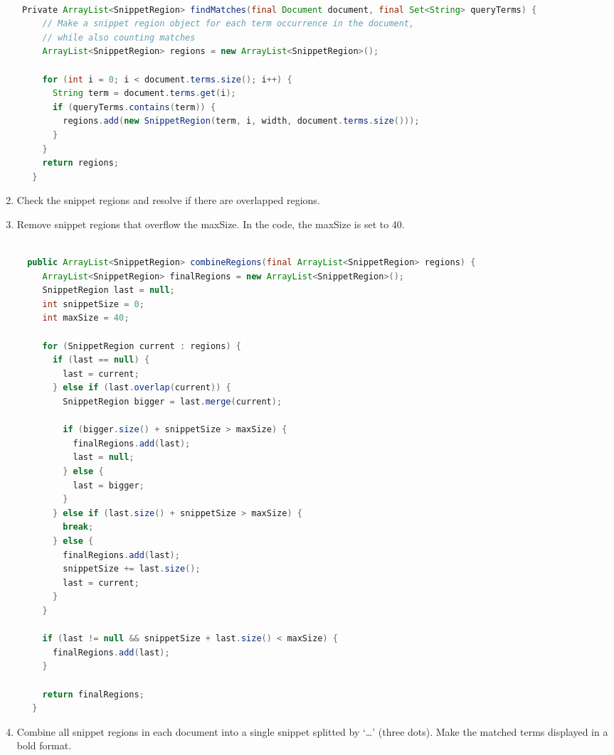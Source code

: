 \documentclass[letterpaper,11pt]{article}
\begin{document}
\begin{enumerate}
\begin{lstlisting}[language=Java, caption={}, label={lst:step3}]

 Private ArrayList<SnippetRegion> findMatches(final Document document, final Set<String> queryTerms) {
     // Make a snippet region object for each term occurrence in the document,
     // while also counting matches
     ArrayList<SnippetRegion> regions = new ArrayList<SnippetRegion>();
 
     for (int i = 0; i < document.terms.size(); i++) {
       String term = document.terms.get(i);
       if (queryTerms.contains(term)) {
         regions.add(new SnippetRegion(term, i, width, document.terms.size()));
       }
     }
     return regions;
   }

\end{lstlisting}

\item Check the snippet regions and resolve if there are overlapped regions.
\item Remove snippet regions that overflow the maxSize. In the code, the maxSize is set to 40. 

\begin{lstlisting}[language=Java, caption={}, label={lst:step4}]

  public ArrayList<SnippetRegion> combineRegions(final ArrayList<SnippetRegion> regions) {
     ArrayList<SnippetRegion> finalRegions = new ArrayList<SnippetRegion>();
     SnippetRegion last = null;
     int snippetSize = 0;
     int maxSize = 40;
 
     for (SnippetRegion current : regions) {
       if (last == null) {
         last = current;
       } else if (last.overlap(current)) {
         SnippetRegion bigger = last.merge(current);
 
         if (bigger.size() + snippetSize > maxSize) {
           finalRegions.add(last);
           last = null;
         } else {
           last = bigger;
         }
       } else if (last.size() + snippetSize > maxSize) {
         break;
       } else {
         finalRegions.add(last);
         snippetSize += last.size();
         last = current;
       }
     }
 
     if (last != null && snippetSize + last.size() < maxSize) {
       finalRegions.add(last);
     }
 
     return finalRegions;
   }

\end{lstlisting}

\item Combine all snippet regions in each document into a single snippet splitted by `…' (three dots). Make the matched terms displayed in a bold format.


\end{enumerate}
\end{document}
